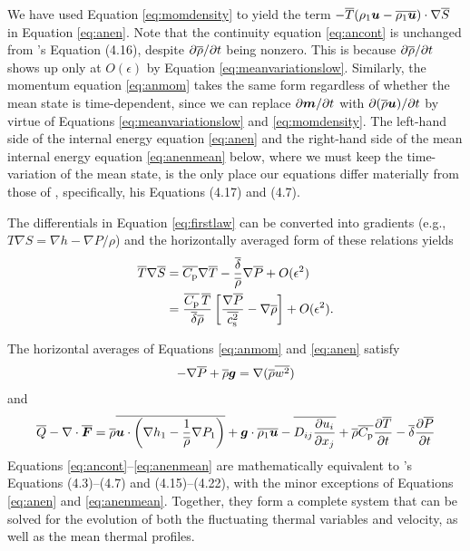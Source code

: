 \documentclass[12pt]{article}
\newcommand{\vecf}{\bm{F}}
\begin{document}
  We have used Equation \eqref{eq:momdensity} to yield the term $- \overline{T}(\rho_1\bm{u}-\overline{\rho_1\bm{u}})\cdot\nabla\overline{S}$ in Equation \eqref{eq:anen}. Note that the continuity equation \eqref{eq:ancont} is unchanged from \citet{Gough1969}'s Equation (4.16), despite $\partial\overline{\rho}/\partial t$ being nonzero. This is because $\partial\overline{\rho}/\partial t$ shows up only at $O(\epsilon)$ by Equation \eqref{eq:meanvariationslow}. Similarly, the momentum equation \eqref{eq:anmom} takes the same form regardless of whether the mean state is time-dependent, since we can replace $\partial\bm{m}/\partial t$ with $\partial(\overline{\rho}\bm{u})/\partial t$ by virtue of Equations \eqref{eq:meanvariationslow} and \eqref{eq:momdensity}. The left-hand side of the internal energy equation \eqref{eq:anen} and the right-hand side of the mean internal energy equation \eqref{eq:anenmean} below, where we must keep the time-variation of the mean state, is the only place our equations differ materially from those of \citet{Gough1969}, specifically, his Equations (4.17) and (4.7).
  
   The differentials in Equation \eqref{eq:firstlaw} can be converted into gradients (e.g., $T\nabla S= \nabla h - \nabla P/\rho$) and the horizontally averaged form of these relations yields 
  \begin{subequations}\label{eq:anfirstlawmean}
  	\begin{align}
  		\overline{T}\nabla\overline{S} &= \overline{C_{\rm{p}}}\nabla\overline{T} - \frac{\overline{\delta}}{\overline{\rho}}\nabla\overline{P} + O(\epsilon^2)\\
  		&= \frac{\overline{C_{\rm{p}}}\,\overline{T}}{\overline{\delta}\overline{\rho}}\left[\frac{\nabla\overline{P}}{\overline{c_{\rm s}^2}}-\nabla\overline{\rho}\right]+O(\epsilon^2).
  	\end{align}
  \end{subequations}
  
   The horizontal averages of Equations \eqref{eq:anmom} and \eqref{eq:anen} satisfy 
  \begin{align}\label{eq:anmommean}
  	-\nabla\overline{P} + \overline{\rho}\bm{g} = \nabla(\overline{\rho} \overline{w^2})
  \end{align}
  and
  \begin{align}\label{eq:anenmean}
  	\heatover - \Div\overline{\vecf} = \rhoover\overline{\vecu\cdot\left(\nabla \enthone-\frac{1}{\rhoover}\nabla \prsone\right)} + \vecg\cdot\overline{\rhoone\vecu} - \overline{D_{ij}\pderiv{u_i}{x_j}} +	\rhoover\cpover\pderiv{\tmpover}{t}- \deltaover \pderiv{\prsover}{t}
  \end{align}
   Equations \eqref{eq:ancont}--\eqref{eq:anenmean} are mathematically equivalent to \citet{Gough1969}'s Equations (4.3)--(4.7) and (4.15)--(4.22), with the minor exceptions of Equations \eqref{eq:anen} and \eqref{eq:anenmean}. Together, they form a complete system that can be solved for the evolution of both the fluctuating thermal variables and velocity, as well as the mean thermal profiles. %
\end{document}
